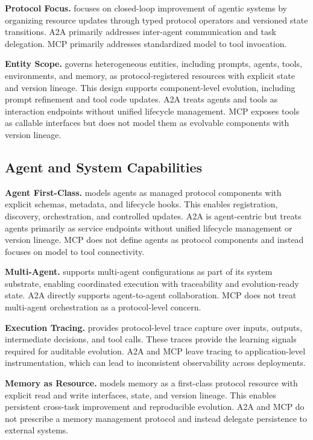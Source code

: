 \textbf{Protocol Focus.} \projectname focuses on closed-loop improvement of agentic systems by organizing resource updates through typed protocol operators and versioned state transitions. A2A primarily addresses inter-agent communication and task delegation. MCP primarily addresses standardized model to tool invocation.

\textbf{Entity Scope.} \projectname governs heterogeneous entities, including prompts, agents, tools, environments, and memory, as protocol-registered resources with explicit state and version lineage. This design supports component-level evolution, including prompt refinement and tool code updates. A2A treats agents and tools as interaction endpoints without unified lifecycle management. MCP exposes tools as callable interfaces but does not model them as evolvable components with version lineage.

\subsection{Agent and System Capabilities}

\textbf{Agent First-Class.} \projectname models agents as managed protocol components with explicit schemas, metadata, and lifecycle hooks. This enables registration, discovery, orchestration, and controlled updates. A2A is agent-centric but treats agents primarily as service endpoints without unified lifecycle management or version lineage. MCP does not define agents as protocol components and instead focuses on model to tool connectivity.

\textbf{Multi-Agent.} \projectname supports multi-agent configurations as part of its system substrate, enabling coordinated execution with traceability and evolution-ready state. A2A directly supports agent-to-agent collaboration. MCP does not treat multi-agent orchestration as a protocol-level concern.

\textbf{Execution Tracing.} \projectname provides protocol-level trace capture over inputs, outputs, intermediate decisions, and tool calls. These traces provide the learning signals required for auditable evolution. A2A and MCP leave tracing to application-level instrumentation, which can lead to inconsistent observability across deployments.

\textbf{Memory as Resource.} \projectname models memory as a first-class protocol resource with explicit read and write interfaces, state, and version lineage. This enables persistent cross-task improvement and reproducible evolution. A2A and MCP do not prescribe a memory management protocol and instead delegate persistence to external systems.

